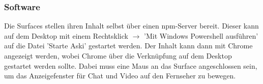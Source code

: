 \documentclass [titlepage,a4paper]{article}
\begin{document}
\subsubsection{Software}

Die Surfaces stellen ihren Inhalt selbst über einen npm-Server bereit. Dieser kann auf dem Desktop mit einem Rechtsklick $\rightarrow$ 'Mit Windows Powershell ausführen' auf die Datei 'Starte Aski' gestartet werden. Der Inhalt kann dann mit Chrome angezeigt werden, wobei Chrome über die Verknüpfung auf dem Desktop gestartet werden sollte. Dabei muss eine Maus an das Surface angeschlossen sein, um das Anzeigefenster für Chat und Video auf den Fernseher zu bewegen.
\end{document}
